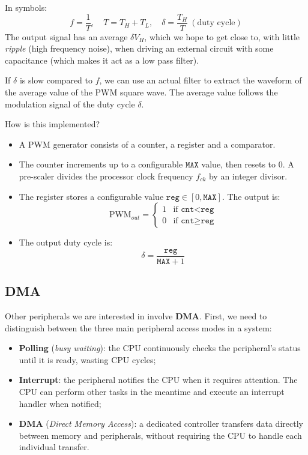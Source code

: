 \documentclass[a4paper,11pt]{article}
\begin{document}
In symbols:
$$
f = \frac{1}{T}, \quad T = T_H + T_L, \quad \delta = \frac{T_H}{T} \ (\text{duty cycle})
$$
The output signal has an average $\delta V_H$, which we hope to get close to, with little \textit{ripple} (high frequency noise), when driving an external circuit with some capacitance (which makes it act as a low pass filter).

If $\delta$ is slow compared to $f$, we can use an actual filter to extract the waveform of the average value of the PWM square wave.
The average value follows the modulation signal of the duty cycle $\delta$.

How is this implemented?
\begin{itemize}
    \item A PWM generator consists of a counter, a register and a comparator.
    \item The counter increments up to a configurable $\texttt{MAX}$ value, then resets to 0. A pre-scaler divides the processor clock frequency $f_{ck}$ by an integer divisor.
    \item The register stores a configurable value $\texttt{reg} \in [0,\texttt{MAX}]$. The output is:
    \[
        \text{PWM}_{out} =
        \begin{cases}
            1 & \text{if } \texttt{cnt} < \texttt{reg} \\
            0 & \text{if } \texttt{cnt} \geq \texttt{reg}
        \end{cases}
    \]
    \item The output duty cycle is:
    \[
        \delta = \frac{\texttt{reg}}{\texttt{MAX}+1}
    \]
\end{itemize}

\subsection{DMA}

Other peripherals we are interested in involve \textbf{DMA}.
First, we need to distinguish between the three main peripheral access modes in a system:
\begin{itemize}
    \item \textbf{Polling} (\textit{busy waiting}): the CPU continuously checks the peripheral's status until it is ready, wasting CPU cycles;
    \item \textbf{Interrupt}: the peripheral notifies the CPU when it requires attention. The CPU can perform other tasks in the meantime and execute an interrupt handler when notified;
    \item \textbf{DMA} (\textit{Direct Memory Access}): a dedicated controller transfers data directly between memory and peripherals, without requiring the CPU to handle each individual transfer.
\end{itemize}
\end{document}

